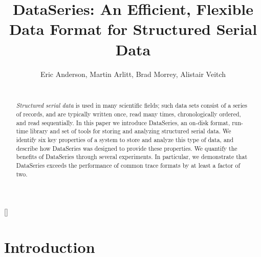 \documentclass{acm_proc_article-sp}
\begin{document}
\newcommand{\DataSeries}{DataSeries}
\newcommand{\DS}{DS}

\title{DataSeries: An Efficient, Flexible Data Format for Structured Serial Data}
\author{
\alignauthor
Eric Anderson, Martin Arlitt, Brad Morrey, Alistair Veitch  \\
  \\
}

\maketitle
[]
 


\begin{abstract}
\textit{Structured serial data} is used in many scientific fields;
such data sets consist of a series of records, and are typically
written once, read many times, chronologically ordered, and read
sequentially.
In this paper we introduce DataSeries, an on-disk format,
run-time library and set of tools for storing and analyzing 
structured serial data.
We identify six key properties of a system to store and analyze
this type of data, and describe how DataSeries was designed
to provide these properties.  We quantify the benefits of DataSeries
through several experiments.  In particular, we demonstrate
that DataSeries exceeds the performance of common trace formats
by at least a factor of two.
\end{abstract}

\section{Introduction}\label{sec:intro}
\end{document}
